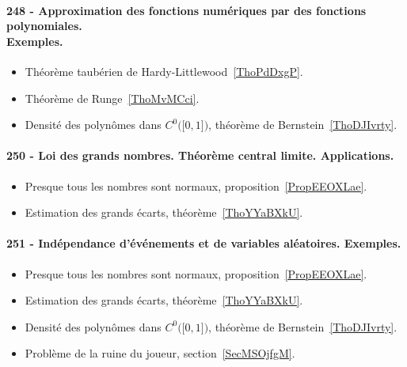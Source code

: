 \paragraph{248 - Approximation des fonctions numériques par des fonctions polynomiales.\\ Exemples.}
\begin{itemize}
    \item Théorème taubérien de Hardy-Littlewood~\ref{ThoPdDxgP}.
    \item Théorème de Runge~\ref{ThoMvMCci}.
    \item Densité des polynômes dans \( C^0\big( \mathopen[ 0 , 1 \mathclose] \big)\), théorème de Bernstein~\ref{ThoDJIvrty}.
\end{itemize}
\paragraph{250 - Loi des grands nombres. Théorème central limite. Applications.}
\begin{itemize}
    \item Presque tous les nombres sont normaux, proposition~\ref{PropEEOXLae}.
    \item Estimation des grands écarts, théorème~\ref{ThoYYaBXkU}.
\end{itemize}
\paragraph{251 - Indépendance d’événements et de variables aléatoires. Exemples.}
\begin{itemize}
    \item Presque tous les nombres sont normaux, proposition~\ref{PropEEOXLae}.
    \item Estimation des grands écarts, théorème~\ref{ThoYYaBXkU}.
    \item Densité des polynômes dans \( C^0\big( \mathopen[ 0 , 1 \mathclose] \big)\), théorème de Bernstein~\ref{ThoDJIvrty}.
    \item Problème de la ruine du joueur, section~\ref{SecMSOjfgM}.
\end{itemize}
